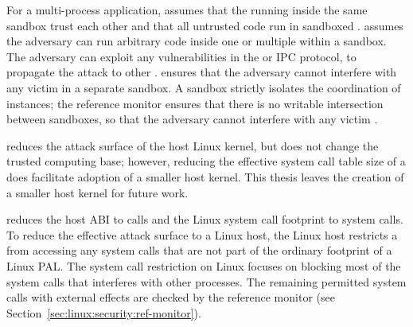 For a multi-process application,
\graphene{} assumes that the \picoprocs{} 
running inside the same sandbox
trust each other and that all untrusted code run in sandboxed \picoprocs{}.
\graphene{} assumes the adversary can run arbitrary code inside
one or multiple \picoprocs within a sandbox.
The adversary can exploit any vulnerabilities in the \libos{}
or IPC protocol,
to propagate the attack to other \picoprocs{}.
\graphene{} ensures that
the adversary cannot interfere with any victim \picoprocs{}
in a separate sandbox.
A sandbox strictly isolates the coordination of \thelibos{} instances;
the reference monitor ensures
that there is no writable intersection between sandboxes, so that
the adversary cannot interfere with any victim \picoprocs{}.



\graphene{} reduces the attack surface of the host Linux kernel, but does not change the trusted computing base; however, reducing the effective system call table size of a \picoproc{} does facilitate adoption of a smaller host kernel.
This thesis leaves the creation of a smaller host kernel for future work.

\label{sec:linux:security:syscall-restriction}


\graphene{} reduces the host ABI to \palcallnum{} calls
and the Linux system call footprint to \hostsyscallnum{} system calls.
To reduce the effective attack surface to a Linux host,
the Linux host restricts a \picoproc{} from accessing any system calls that are not part of the ordinary footprint of a Linux PAL.
The system call restriction on Linux focuses on blocking most of the system calls
that interferes with other processes.
The remaining permitted system calls with external effects are checked by 
the reference monitor (see Section~\ref{sec:linux:security:ref-monitor}).
 


